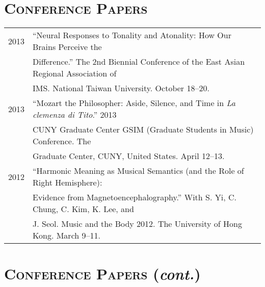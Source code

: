 \documentclass[letter,11pt,draft]{article}
\begin{document}
  \vspace{2.5mm}
  
  \section*{\textsc{Conference Papers}}
  
  \hspace*{-0.25cm}
  \begin{tabular}{p{2.5cm} p{12.5cm}}
  2013 & “Neural Responses to Tonality and Atonality: How Our Brains Perceive the\\
  & Difference.” The 2nd Biennial Conference of the East Asian Regional Association of\\
  & IMS. National Taiwan University. October 18–20.\\[2mm]

  2013 & “Mozart the Philosopher: Aside, Silence, and Time in \textit{La clemenza di Tito}.” 2013\\
  & CUNY Graduate Center GSIM (Graduate Students in Music) Conference. The\\
  & Graduate Center, CUNY, United States. April 12–13.\\[2mm]

  2012 & “Harmonic Meaning as Musical Semantics (and the Role of Right Hemisphere):\\
  & Evidence from Magnetoencephalography.” With S. Yi, C. Chung, C. Kim, K. Lee, and\\
  & J. Seol. Music and the Body 2012. The University of Hong Kong. March 9–11.
  \end{tabular}
  
  \section*{\textsc{Conference Papers} (\textit{cont.})}
  
\end{document}
